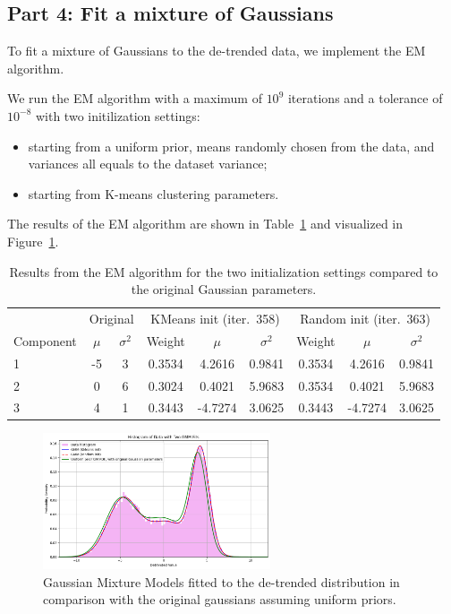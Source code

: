 \documentclass[a4paper]{article}
\begin{document}
\subsection*{Part 4: Fit a mixture of Gaussians}

To fit a mixture of Gaussians to the de-trended data, we implement the EM algorithm.

We run the EM algorithm with a maximum of $10^9$ iterations and a tolerance of $10^{-8}$ with two initilization settings:
\begin{itemize}
    \setlength\itemsep{0.01em}
  \item starting from a uniform prior, means randomly chosen from the data, and variances all equals to the dataset variance;
  \item starting from K-means clustering parameters.
\end{itemize}

The results of the EM algorithm are shown in Table~\ref{tab:gmm-results} and visualized in Figure~\ref{fig:gmm-plot}.

\begin{table}[htbp]
  \centering
  \small
  \begin{tabular}{l cc|ccc|ccc}
    \toprule
    & \multicolumn{2}{c}{Original} & \multicolumn{3}{c}{KMeans init (iter.\ 358)} & \multicolumn{3}{c}{Random init (iter.\ 363)} \\
    \cmidrule(lr){2-3} \cmidrule(lr){4-6} \cmidrule(lr){7-9}
    Component & $\mu$ & $\sigma^2$ & Weight & $\mu$ & $\sigma^2$ & Weight & $\mu$ & $\sigma^2$ \\
    \midrule
    1 & -5 & 3 & 0.3534 & 4.2616 & 0.9841 & 0.3534 & 4.2616 & 0.9841 \\
    2 &  0 & 6 & 0.3024 & 0.4021 & 5.9683 & 0.3534 & 0.4021 & 5.9683 \\
    3 &  4 & 1 & 0.3443 & -4.7274 & 3.0625 & 0.3443 & -4.7274 & 3.0625 \\
    \bottomrule
  \end{tabular}
  \caption{
    Results from the EM algorithm for the two initialization settings compared to the original Gaussian parameters.
  }\label{tab:gmm-results}
\end{table}

\begin{figure}[htbp]
  \centering
  \includegraphics[width=0.6\textwidth]{images/gmm.png}\caption{
    Gaussian Mixture Models fitted to the de-trended distribution in comparison with the original gaussians assuming uniform priors.
  }\label{fig:gmm-plot}
\end{figure}
\end{document}
